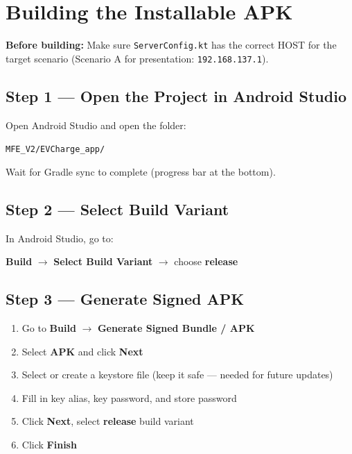 \documentclass[12pt,a4paper]{article}
\begin{document}
\section{Building the Installable APK}

\begin{warnbox}
\textbf{Before building:} Make sure \texttt{ServerConfig.kt} has the correct HOST for
the target scenario (Scenario A for presentation: \texttt{192.168.137.1}).
\end{warnbox}

\subsection{Step 1 --- Open the Project in Android Studio}

Open Android Studio and open the folder:

\begin{codebox}
\texttt{MFE\_V2/EVCharge\_app/}
\end{codebox}

Wait for Gradle sync to complete (progress bar at the bottom).

\subsection{Step 2 --- Select Build Variant}

In Android Studio, go to:

\begin{codebox}
\textbf{Build} $\rightarrow$ \textbf{Select Build Variant} $\rightarrow$ choose \textbf{release}
\end{codebox}

\subsection{Step 3 --- Generate Signed APK}

\begin{enumerate}[leftmargin=1.5cm]
  \item Go to \textbf{Build} $\rightarrow$ \textbf{Generate Signed Bundle / APK}
  \item Select \textbf{APK} and click \textbf{Next}
  \item Select or create a keystore file (keep it safe --- needed for future updates)
  \item Fill in key alias, key password, and store password
  \item Click \textbf{Next}, select \textbf{release} build variant
  \item Click \textbf{Finish}
\end{enumerate}
\end{document}
